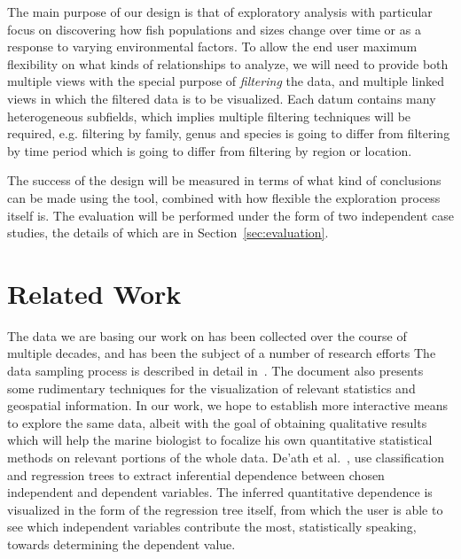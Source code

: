 \documentclass[letterpaper]{article} %
\begin{document}
The main purpose of our design is that of exploratory analysis with particular
focus on discovering how fish populations and sizes change over time or as
a response to varying environmental factors.  To allow the end user maximum
flexibility on what kinds of relationships to analyze, we will need to provide
both multiple views with the special purpose of \emph{filtering} the data, and
multiple linked views in which the filtered data is to be visualized.  Each
datum contains many heterogeneous subfields, which implies multiple filtering
techniques will be required, e.g. filtering by family, genus and species is
going to differ from filtering by time period which is going to differ from
filtering by region or location.

The success of the design will be measured in terms of what kind of conclusions
can be made using the tool, combined with how flexible the exploration process
itself is.  The evaluation will be performed under the form of two independent
case studies, the details of which are in Section~\ref{sec:evaluation}.

\section{Related Work}

The data we are basing our work on has been collected over the course of
multiple decades, and has been the subject of a number of research efforts The
data sampling process is described in detail in~\cite{smith2011multispecies}.
The document also presents some rudimentary techniques for the visualization of
relevant statistics and geospatial information.  In our work, we hope to
establish more interactive means to explore the same data, albeit with the goal
of obtaining qualitative results which will help the marine biologist to
focalize his own quantitative statistical methods on relevant portions of the
whole data.  De'ath et al.~\cite{de2000classification}, use classification and
regression trees to extract inferential dependence between chosen independent
and dependent variables.  The inferred quantitative dependence is visualized in
the form of the regression tree itself, from which the user is able to see
which independent variables contribute the most, statistically speaking,
towards determining the dependent value.
\end{document}
